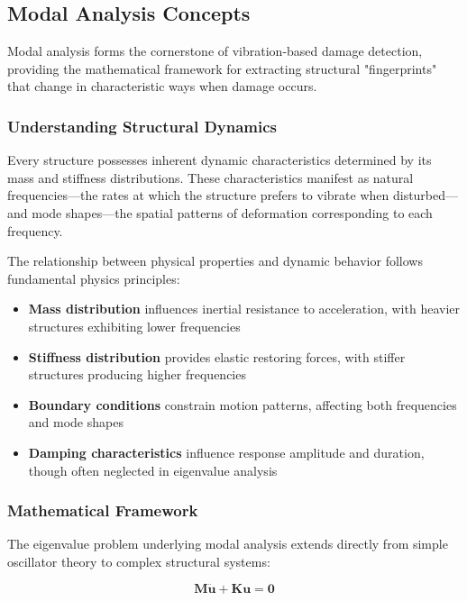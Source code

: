 \documentclass[11pt,a4paper]{article}
\begin{document}
\subsection{Modal Analysis Concepts}

Modal analysis forms the cornerstone of vibration-based damage detection, providing the mathematical framework for extracting structural "fingerprints" that change in characteristic ways when damage occurs.

\subsubsection{Understanding Structural Dynamics}

Every structure possesses inherent dynamic characteristics determined by its mass and stiffness distributions. These characteristics manifest as natural frequencies—the rates at which the structure prefers to vibrate when disturbed—and mode shapes—the spatial patterns of deformation corresponding to each frequency.

The relationship between physical properties and dynamic behavior follows fundamental physics principles:
\begin{itemize}
    \item \textbf{Mass distribution} influences inertial resistance to acceleration, with heavier structures exhibiting lower frequencies
    \item \textbf{Stiffness distribution} provides elastic restoring forces, with stiffer structures producing higher frequencies
    \item \textbf{Boundary conditions} constrain motion patterns, affecting both frequencies and mode shapes
    \item \textbf{Damping characteristics} influence response amplitude and duration, though often neglected in eigenvalue analysis
\end{itemize}

\subsubsection{Mathematical Framework}

The eigenvalue problem underlying modal analysis extends directly from simple oscillator theory to complex structural systems:

\begin{equation}
\mathbf{M}\ddot{\mathbf{u}} + \mathbf{K}\mathbf{u} = \mathbf{0}
\end{equation}
\end{document}
